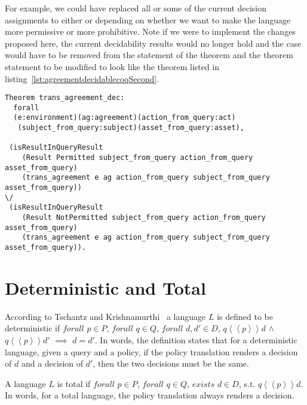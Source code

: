 For example, we could have replaced all or some of the current  decision assignments to either  or  depending on whether we want to make the language more permissive or more prohibitive. Note if we were to implement the changes proposed here, the current decidability results would no longer hold and the  case would have to be removed from the statement of the theorem and the theorem statement to be modified to look like the theorem listed in listing~\ref{lst:agreementdecidablecoqSecond}.

\begin{minipage}[c]{0.95\textwidth}
\begin{lstlisting}
Theorem trans_agreement_dec:
  forall
  (e:environment)(ag:agreement)(action_from_query:act)
   (subject_from_query:subject)(asset_from_query:asset),

 (isResultInQueryResult 
    (Result Permitted subject_from_query action_from_query asset_from_query)
    (trans_agreement e ag action_from_query subject_from_query asset_from_query)) 
\/
 (isResultInQueryResult 
    (Result NotPermitted subject_from_query action_from_query asset_from_query)
    (trans_agreement e ag action_from_query subject_from_query asset_from_query)).

\end{lstlisting}
\end{minipage}



\section{Deterministic and Total}

According to Tschantz and Krishnamurthi~\cite{Tschantz} a language $L$ is defined to be deterministic if $forall$ $p \in P$, $forall$ $q \in Q$, $forall$ $d, d' \in D$, $q \left\langle\left\langle p  \right\rangle\right\rangle d$ $\land$ $q \left\langle\left\langle p  \right\rangle\right\rangle d'$ $\implies$ $d = d'$. In words, the definition states that for a deterministic language, given a query and a policy, if the policy translation renders a decision of $d$ and a decision of $d'$, then the two decisions must be the same.

A language $L$ is total if $forall$ $p \in P$, $forall$ $q \in Q$, $exists$ $d \in D$, s.t. $q \left\langle\left\langle p  \right\rangle\right\rangle d$. In words, for a total language, the policy translation always renders a decision.

